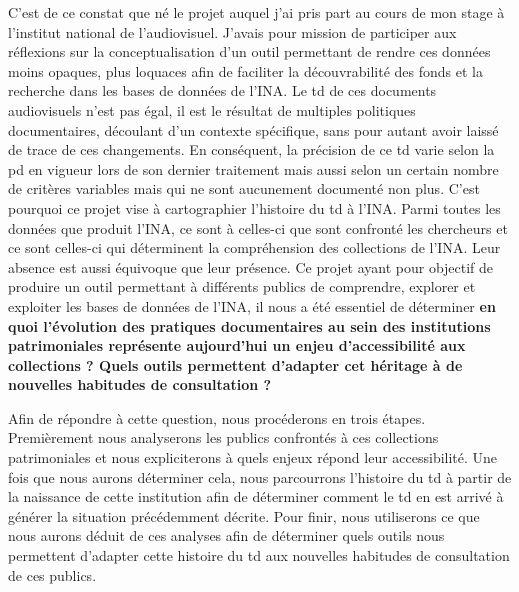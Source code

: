 C'est de ce constat que né le projet auquel j'ai pris part au cours de mon stage à l'institut national de l'audiovisuel. J'avais pour mission de participer aux réflexions sur la conceptualisation d'un outil permettant de rendre ces données moins opaques, plus loquaces afin de faciliter la découvrabilité des fonds et la recherche dans les bases de données de l'INA. Le \gls{td} de ces documents audiovisuels n'est pas égal, il est le résultat de multiples politiques documentaires, découlant d'un contexte spécifique, sans pour autant avoir laissé de trace de ces changements. En conséquent, la précision de ce \gls{td} varie selon la \gls{pd} en vigueur lors de son dernier traitement mais aussi selon un certain nombre de critères variables mais qui ne sont aucunement documenté non plus. C'est pourquoi ce projet vise à cartographier l'histoire du \gls{td} à l'INA. Parmi toutes les données que produit l'INA, ce sont à celles-ci que sont confronté les chercheurs et ce sont celles-ci qui déterminent la compréhension des collections de l'INA. Leur absence est aussi équivoque que leur présence. Ce projet ayant pour objectif de produire un outil permettant à différents publics de comprendre, explorer et exploiter les bases de données de l'INA, il nous a été essentiel de déterminer \textbf{en quoi l'évolution des pratiques documentaires au sein des institutions patrimoniales représente aujourd'hui un enjeu d'accessibilité aux collections ? Quels outils permettent d'adapter cet héritage à de nouvelles habitudes de consultation ?}


Afin de répondre à cette question, nous procéderons en trois étapes. Premièrement nous analyserons les publics confrontés à ces collections patrimoniales et nous expliciterons à quels enjeux répond leur accessibilité. Une fois que nous aurons déterminer cela, nous parcourrons l'histoire du \gls{td} à partir de la naissance de cette institution afin de déterminer comment le \gls{td} en est arrivé à générer la situation précédemment décrite. Pour finir, nous utiliserons ce que nous aurons déduit de ces analyses afin de déterminer quels outils nous permettent d'adapter cette histoire du \gls{td} aux nouvelles habitudes de consultation de ces publics. 


